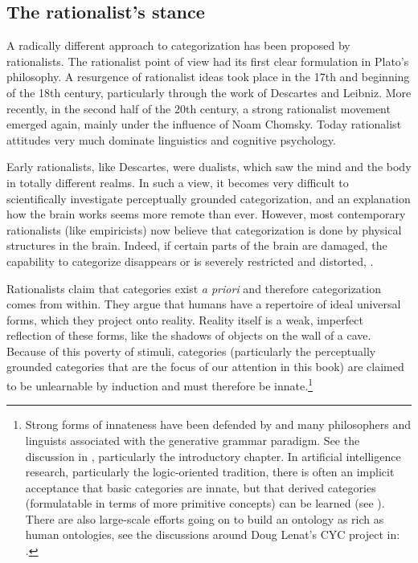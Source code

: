 \subsection{The rationalist's stance}

A radically different approach to categorization has been 
proposed by rationalists. 
The rationalist point of view had its first clear formulation 
in Plato's philosophy. A resurgence of rationalist ideas
took place in the 17th and beginning of the
18th century, particularly through the work of 
Descartes and Leibniz. More recently, in the second half of
the 20th century, a strong rationalist movement
emerged again, mainly under the influence of Noam
Chomsky. Today rationalist attitudes very much 
dominate linguistics and cognitive psychology. 

Early rationalists, like Descartes, were dualists, which
saw the mind and the body in totally different realms. 
In such a view, it becomes very difficult to scientifically investigate 
perceptually grounded categorization, and an explanation 
how the brain works seems more remote than ever. However, 
most contemporary rationalists (like empiricists)
now believe that categorization
is done by physical structures in the brain. Indeed, 
if certain parts of the brain are damaged, the capability 
to categorize disappears or is severely restricted and 
distorted, \cite{Deacon:1998}. 

Rationalists claim that categories 
exist {\it a priori} and therefore categorization comes from
within. They argue that humans have a repertoire of ideal universal
forms, which they project
onto reality. Reality itself is a weak, imperfect 
reflection of these forms, like the shadows of objects
on the wall of a cave. Because of this poverty of stimuli, 
categories (particularly the perceptually grounded
categories that are the focus of our attention in this 
book) are claimed to be unlearnable by induction and must
therefore be innate.\footnote{
Strong forms of innateness have been defended by 
\cite{Fodor:1983}
and many philosophers and linguists associated with the 
generative grammar paradigm. See the discussion in
\cite{Wierzbicka:1992}, particularly the introductory chapter. 
In artificial intelligence 
research, particularly the logic-oriented tradition, there
is often an implicit acceptance that basic categories 
are innate, but that derived categories (formulatable
in terms of more primitive concepts) can be learned
(see \cite{McCarthy:2008}). There are also 
large-scale efforts going on to build an ontology as 
rich as human ontologies, see the discussions around
Doug Lenat's CYC project in: \cite{Steels:1994}.}

